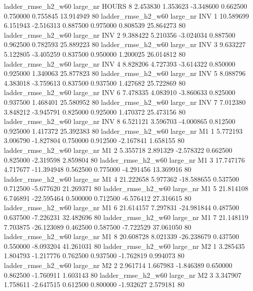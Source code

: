  ladder_rmse_h2_w60   large_nr    HOURS                 8  2.453830  1.353623  -3.348600 0.662500 0.750000  0.755845   13.914949 80
 ladder_rmse_h2_w60   large_nr      INV                 1 10.589699  6.151943  -2.516313 0.887500 0.975000  0.808539   25.864273 80
 ladder_rmse_h2_w60   large_nr      INV                 2  9.388422  5.210356  -3.024034 0.887500 0.962500  0.782593   25.889223 80
 ladder_rmse_h2_w60   large_nr      INV                 3  9.633227  5.122805  -3.405259 0.837500 0.950000  1.200025   26.014812 80
 ladder_rmse_h2_w60   large_nr      INV                 4  8.828206  4.727393  -3.614322 0.850000 0.925000  1.340063   25.877823 80
 ladder_rmse_h2_w60   large_nr      INV                 5  8.088796  4.383018  -3.759613 0.837500 0.937500  1.427682   25.722869 80
 ladder_rmse_h2_w60   large_nr      INV                 6  7.478335  4.083910  -3.860633 0.825000 0.937500  1.468401   25.580952 80
 ladder_rmse_h2_w60   large_nr      INV                 7  7.012380  3.848212  -3.945791 0.825000 0.925000  1.470372   25.473156 80
 ladder_rmse_h2_w60   large_nr      INV                 8  6.521121  3.596703  -4.000865 0.812500 0.925000  1.417372   25.392383 80
 ladder_rmse_h2_w60   large_nr       M1                 1  5.772193  3.006790  -1.827804 0.750000 0.912500 -2.167841    1.658155 80
 ladder_rmse_h2_w60   large_nr       M1                 2  5.355718  2.891329  -2.578322 0.662500 0.825000 -2.319598    2.859804 80
 ladder_rmse_h2_w60   large_nr       M1                 3 17.747176  4.717677 -11.394948 0.562500 0.775000 -4.291456   13.369916 80
 ladder_rmse_h2_w60   large_nr       M1                 4 21.222658  5.977362 -18.588655 0.537500 0.712500 -5.677620   21.269371 80
 ladder_rmse_h2_w60   large_nr       M1                 5 21.814108  6.746891 -22.595464 0.500000 0.712500 -6.576412   27.316615 80
 ladder_rmse_h2_w60   large_nr       M1                 6 21.614157  7.297831 -24.981844 0.487500 0.637500 -7.226231   32.482696 80
 ladder_rmse_h2_w60   large_nr       M1                 7 21.148119  7.703875 -26.123089 0.462500 0.587500 -7.722529   37.061050 80
 ladder_rmse_h2_w60   large_nr       M1                 8 20.608728  8.021339 -26.238679 0.437500 0.550000 -8.093204   41.261031 80
 ladder_rmse_h2_w60   large_nr       M2                 1  3.285435  1.804793  -1.217776 0.762500 0.937500 -1.762819    0.994073 80
 ladder_rmse_h2_w60   large_nr       M2                 2  2.961714  1.667983  -1.846389 0.650000 0.862500 -1.760911    1.603143 80
 ladder_rmse_h2_w60   large_nr       M2                 3  3.347907  1.758611  -2.647515 0.612500 0.800000 -1.932627    2.579181 80
